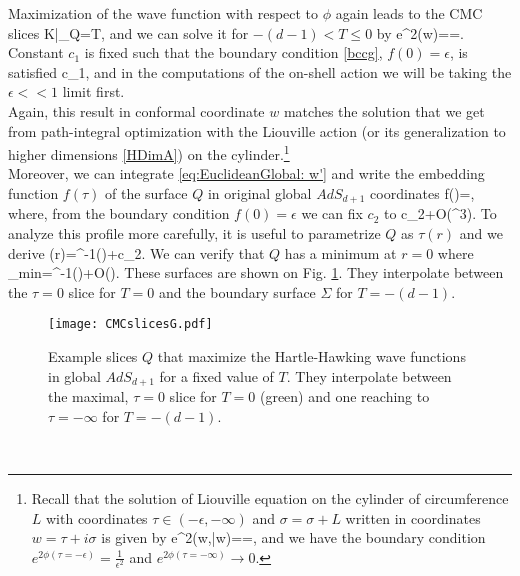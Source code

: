 \documentclass[a4paper,12pt]{article}
\begin{document}
Maximization of the wave function with respect to $\phi$ again leads to the CMC slices
\be
K|_Q=T,
\ee
and we can solve it for $-(d-1)<T\le 0$ by
\be
e^{2\phi(w)}==.
\ee
Constant $c_1$ is fixed such that the boundary condition \eqref{bccg}, $f(0)=\epsilon$, is satisfied
\be
c_1\simeq {},
\ee
and in the computations of the on-shell action we will be taking the $\epsilon<<1$ limit first.\\
Again, this result in conformal coordinate $w$ matches the solution that we get from path-integral optimization with the Liouville action (or its generalization to higher dimensions \eqref{HDimA}) on the cylinder.\footnote{Recall that the solution of Liouville equation on the cylinder of circumference $L$ with coordinates $\tau\in (-\epsilon,-\infty)$ and $\sigma=\sigma+L$ written in coordinates $w=\tau+i\sigma$ is given by
\be
e^{2\phi(w,\bar{w})}==,
\ee
and we have the boundary condition $e^{2\phi(\tau=-\epsilon)}=\frac{1}{\epsilon^2}$ and $e^{2\phi(\tau=-\infty)}\to0$.}\\
Moreover, we can integrate \eqref{eq:EuclideanGlobal: w'} and write the embedding function $f(\tau)$ of the surface $Q$ in original global $AdS_{d+1}$ coordinates 
\be
f(\tau)=,
\ee
where, from the boundary condition $f(0)=\epsilon$ we can fix $c_2$ to
\be
c_2\simeq {}+O(\epsilon^3).\label{c2G}
\ee
To analyze this profile more carefully, it is useful to parametrize $Q$ as $\tau(r)$ and we derive
\be
\tau(r)=\sinh^{-1}\left(\right)+c_2.
\ee
We can verify that $Q$ has a minimum at $r=0$ where
\be
\tau_{min}=\tanh^{-1}\left(\right)+O(\epsilon).
\ee
These surfaces are shown on Fig. \ref{CMCslicesG}. They interpolate between the $\tau=0$ slice for $T=0$ and the boundary surface $\Sigma$ for $T=-(d-1)$.
\begin{figure}[t!]
  \centering
  \texttt{[image: CMCslicesG.pdf]}
  \caption{Example slices $Q$ that maximize the Hartle-Hawking wave functions in global $AdS_{d+1}$ for a fixed value of $T$. They interpolate between the maximal, $\tau=0$ slice for $T=0$ (green) and one reaching to $\tau=-\infty$ for $T=-(d-1)$.}
\label{CMCslicesG}
\end{figure}\\
\end{document}
